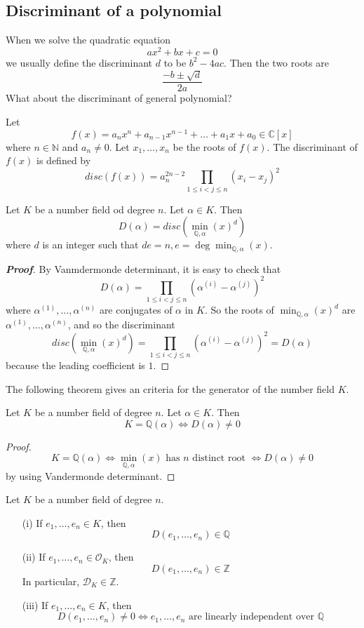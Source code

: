 \subsection{Discriminant of a polynomial}
When we solve the quadratic equation
$$ax^2+bx+c=0$$ we usually define the discriminant $d$ to be
$b^2-4ac$. Then the two roots are
$$\frac{-b \pm \sqrt{d}}{2a}$$
What about the discriminant of general polynomial?
\begin{definition} Let
$$f(x)=a_nx^n+a_{n-1}x^{n-1}+\ldots+a_1x+a_0 \in \mathbb{C}[x]$$
where $n \in \mathbb{N}$ and $a_n \neq 0$. Let $x_1,\ldots,x_n$ be the roots of $f(x)$. The discriminant of $f(x)$ is defined by
$$disc(f(x))=a^{2n-2}_n\prod_{1 \le i <j \le n}(x_i-x_j)^2$$
\end{definition}
\begin{theorem} Let $K$ be a number field od degree $n$. Let $\alpha \in K$. Then
$$D(\alpha)=disc(\min_{\mathbb{Q},\alpha}(x)^d)$$
where $d$ is an integer such that $d e=n, e=\deg{\min_{\mathbb{Q},\alpha}(x)}$.
\end{theorem}
\begin{proof}[\bf Proof] By Vanmdermonde determinant, it is easy to check that
$$D(\alpha)=\prod_{1 \le i <j \le n}\left(\alpha^{(i)}-\alpha^{(j)}\right)^2$$
where $\alpha^{(1)},\ldots,\alpha^{(n)}$ are conjugates of $\alpha$ in $K$.
So the roots of $\min_{\mathbb{Q},\alpha}(x)^d$ are $\alpha^{(1)},\ldots,\alpha^{(n)}$, and so the discriminant
$$disc(\min_{\mathbb{Q},\alpha}(x)^d)=\prod_{1 \le i <j \le n}\left(\alpha^{(i)}-\alpha^{(j)}\right)^2=D(\alpha)$$
because the leading coefficient is $1$.
\end{proof}
The following theorem gives an criteria for the generator of the number field $K$.
\begin{theorem} Let $K$ be a number field of degree $n$. Let $\alpha \in K$. Then
$$K=\mathbb{Q}(\alpha) \iff D(\alpha) \neq 0$$
\end{theorem}
\begin{proof}
$$K=\mathbb{Q}(\alpha) \iff \min_{\mathbb{Q},\alpha}(x) \text{ has } n \text{ distinct root } \iff D(\alpha)\neq 0$$
by using Vandermonde determinant.
\end{proof}
\begin{theorem} Let $K$ be a number field of degree $n$.
\begin{enumerate}
\item[(i)] If $e_1,\ldots,e_n \in K$, then $$D(e_1,\ldots,e_n) \in \mathbb{Q}$$
\item[(ii)] If $e_1,\ldots,e_n \in \mathcal{O}_K$, then $$D(e_1,\ldots,e_n) \in \mathbb{Z}$$
In particular, $\mathcal{D}_K \in \mathbb{Z}$.
\item[(iii)] If $e_1,\ldots,e_n \in K$, then
$$D(e_1,\ldots,e_n) \neq 0 \iff e_1,\ldots,e_n \text{ are linearly independent over } \mathbb{Q}$$
\end{enumerate}
\end{theorem}
